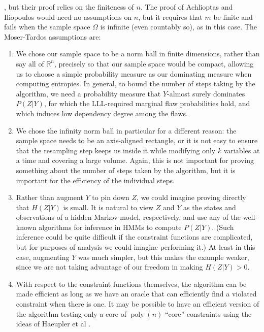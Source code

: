 \documentclass[twocolumn]{article}
\newcommand{\Reals}%
  {\mathbb{R}}
\begin{document}

, but their proof relies on the finiteness of $n$.  The proof of Achlioptas and Iliopoulos would need no assumptions on $n$, but it requires that $m$ be finite and fails when the sample space $\Omega$ is infinite (even countably so), as in this case.  The Moser-Tardos assumptions are:


\begin{enumerate}
  \item We chose our sample space to be a norm ball in finite dimensions, rather than say all of $\Reals^n$, precisely so that our sample space would be compact, allowing us to choose a simple probability measure as our dominating measure when computing entropies.  In general, to bound the number of steps taking by the algorithm, we need a probability measure that $Y$-almost surely dominates $P(Z | Y)$, for which the LLL-required marginal flaw probabilities hold, and which induces low dependency degree among the flaws.
  \item We chose the infinity norm ball in particular for a different reason: the sample space needs to be an axis-aligned rectangle, or it is not easy to ensure that the resampling step keeps us inside it while modifying only $k$ variables at a time and covering a large volume.  Again, this is not important for proving something about the number of steps taken by the algorithm, but it is important for the efficiency of the individual steps.
  \item Rather than augment $Y$ to pin down $Z$, we could imagine proving directly that $H(Z | Y)$ is small.  It is natural to view $Z$ and $Y$ as the states and observations of a hidden Markov model, respectively, and use any of the well-known algorithms for inference in HMMs to compute $P(Z | Y)$.  (Such inference could be quite difficult if the constraint functions are complicated, but for purposes of analysis we could imagine performing it.)  At least in this case, augmenting $Y$ was much simpler, but this makes the example weaker, since we are not taking advantage of our freedom in making $H(Z | Y) > 0$.
  \item With respect to the constraint functions themselves, the algorithm can be made efficient as long as we have an oracle that can efficiently find a violated constraint when there is one.  It may be possible to have an efficient version of the algorithm testing only a core of $\operatorname{poly}(n)$ ``core'' constraints using the ideas of Haeupler et al \cite{haeupler2011new}.
\end{enumerate}
\end{document}
